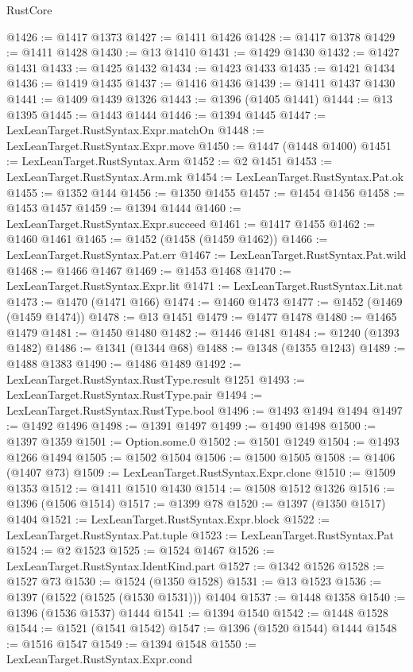 \begin{lexlean}{RustCore}
\begin{coremodule}
@1426 := @1417 @1373
@1427 := @1411 @1426
@1428 := @1417 @1378
@1429 := @1411 @1428
@1430 := @13 @1410
@1431 := @1429 @1430
@1432 := @1427 @1431
@1433 := @1425 @1432
@1434 := @1423 @1433
@1435 := @1421 @1434
@1436 := @1419 @1435
@1437 := @1416 @1436
@1439 := @1411 @1437 @1430
@1441 := @1409 @1439 @1326
@1443 := @1396 (@1405 @1441)
@1444 := @13 @1395
@1445 := @1443 @1444
@1446 := @1394 @1445
@1447 := LexLeanTarget.RustSyntax.Expr.matchOn
@1448 := LexLeanTarget.RustSyntax.Expr.move
@1450 := @1447 (@1448 @1400)
@1451 := LexLeanTarget.RustSyntax.Arm
@1452 := @2 @1451
@1453 := LexLeanTarget.RustSyntax.Arm.mk
@1454 := LexLeanTarget.RustSyntax.Pat.ok
@1455 := @1352 @144
@1456 := @1350 @1455
@1457 := @1454 @1456
@1458 := @1453 @1457
@1459 := @1394 @1444
@1460 := LexLeanTarget.RustSyntax.Expr.succeed
@1461 := @1417 @1455
@1462 := @1460 @1461
@1465 := @1452 (@1458 (@1459 @1462))
@1466 := LexLeanTarget.RustSyntax.Pat.err
@1467 := LexLeanTarget.RustSyntax.Pat.wild
@1468 := @1466 @1467
@1469 := @1453 @1468
@1470 := LexLeanTarget.RustSyntax.Expr.lit
@1471 := LexLeanTarget.RustSyntax.Lit.nat
@1473 := @1470 (@1471 @166)
@1474 := @1460 @1473
@1477 := @1452 (@1469 (@1459 @1474))
@1478 := @13 @1451
@1479 := @1477 @1478
@1480 := @1465 @1479
@1481 := @1450 @1480
@1482 := @1446 @1481
@1484 := @1240 (@1393 @1482)
@1486 := @1341 (@1344 @68)
@1488 := @1348 (@1355 @1243)
@1489 := @1488 @1383
@1490 := @1486 @1489
@1492 := LexLeanTarget.RustSyntax.RustType.result @1251
@1493 := LexLeanTarget.RustSyntax.RustType.pair
@1494 := LexLeanTarget.RustSyntax.RustType.bool
@1496 := @1493 @1494 @1494
@1497 := @1492 @1496
@1498 := @1391 @1497
@1499 := @1490 @1498
@1500 := @1397 @1359
@1501 := Option.some.{0}
@1502 := @1501 @1249
@1504 := @1493 @1266 @1494
@1505 := @1502 @1504
@1506 := @1500 @1505
@1508 := @1406 (@1407 @73)
@1509 := LexLeanTarget.RustSyntax.Expr.clone
@1510 := @1509 @1353
@1512 := @1411 @1510 @1430
@1514 := @1508 @1512 @1326
@1516 := @1396 (@1506 @1514)
@1517 := @1399 @78
@1520 := @1397 (@1350 @1517) @1404
@1521 := LexLeanTarget.RustSyntax.Expr.block
@1522 := LexLeanTarget.RustSyntax.Pat.tuple
@1523 := LexLeanTarget.RustSyntax.Pat
@1524 := @2 @1523
@1525 := @1524 @1467
@1526 := LexLeanTarget.RustSyntax.IdentKind.part
@1527 := @1342 @1526
@1528 := @1527 @73
@1530 := @1524 (@1350 @1528)
@1531 := @13 @1523
@1536 := @1397 (@1522 (@1525 (@1530 @1531))) @1404
@1537 := @1448 @1358
@1540 := @1396 (@1536 @1537) @1444
@1541 := @1394 @1540
@1542 := @1448 @1528
@1544 := @1521 (@1541 @1542)
@1547 := @1396 (@1520 @1544) @1444
@1548 := @1516 @1547
@1549 := @1394 @1548
@1550 := LexLeanTarget.RustSyntax.Expr.cond

\end{coremodule}
\end{lexlean}
